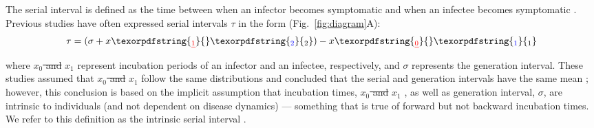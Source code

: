 \documentclass[12pt]{article}
\newcommand{\fref}[1]{Fig.~\ref{fig:#1}}
\newcommand{\gtime}{\sigma} %
\providecommand{\DIFaddtex}[1]{{\protect\color{blue}\uwave{#1}}} %
\providecommand{\DIFdeltex}[1]{{\protect\color{red}\sout{#1}}}                      %
\providecommand{\DIFaddbegin}{} %
\providecommand{\DIFaddend}{} %
\providecommand{\DIFdelbegin}{} %
\providecommand{\DIFdelend}{} %
\providecommand{\DIFadd}[1]{\texorpdfstring{\DIFaddtex{#1}}{#1}} %
\providecommand{\DIFdel}[1]{\texorpdfstring{\DIFdeltex{#1}}{}} %
\newcommand{\DIFscaledelfig}{0.5}
\newlength{\DIFdelgraphicswidth} %
\newlength{\DIFdelgraphicsheight} %
\newcommand{\DIFaddincludegraphics}[2][]{{\color{blue}\fbox{\DIFOincludegraphics[#1]{#2}}}} %
\newcommand{\DIFdelincludegraphics}[2][]{%
\sbox{\DIFdelgraphicsbox}{\DIFOincludegraphics[#1]{#2}}%
\settoboxwidth{\DIFdelgraphicswidth}{\DIFdelgraphicsbox} %
\settoboxtotalheight{\DIFdelgraphicsheight}{\DIFdelgraphicsbox} %
\scalebox{\DIFscaledelfig}{%
\parbox[b]{\DIFdelgraphicswidth}{\usebox{\DIFdelgraphicsbox}\\[-\baselineskip] \rule{\DIFdelgraphicswidth}{0em}}\llap{\resizebox{\DIFdelgraphicswidth}{\DIFdelgraphicsheight}{%
\setlength{\unitlength}{\DIFdelgraphicswidth}%
\begin{picture}(1,1)%
\thicklines\linethickness{2pt} %
{\color[rgb]{1,0,0}\put(0,0){\framebox(1,1){}}}%
{\color[rgb]{1,0,0}\put(0,0){\line( 1,1){1}}}%
{\color[rgb]{1,0,0}\put(0,1){\line(1,-1){1}}}%
\end{picture}%
}\hspace*{3pt}}} %
} %
\DeclareRobustCommand{\DIFaddbegin}{\DIFOaddbegin \let\includegraphics\DIFaddincludegraphics} %
\DeclareRobustCommand{\DIFaddend}{\DIFOaddend \let\includegraphics\DIFOincludegraphics} %
\DeclareRobustCommand{\DIFdelbegin}{\DIFOdelbegin \let\includegraphics\DIFdelincludegraphics} %
\DeclareRobustCommand{\DIFdelend}{\DIFOaddend \let\includegraphics\DIFOincludegraphics} %
\begin{document}
The serial interval is defined as the time between when an infector becomes symptomatic and when an infectee becomes symptomatic \citep{svensson2007note}.
Previous studies have often expressed serial intervals $\tau$ in the form (\fref{diagram}A):
\begin{equation}
\tau = (\gtime + x\DIFdelbegin \DIFdel{_1}\DIFdelend \DIFaddbegin \DIFadd{_2}\DIFaddend ) - x\DIFdelbegin \DIFdel{_0
}\DIFdelend \DIFaddbegin \DIFadd{_1
}\DIFaddend \end{equation}
where \DIFdelbegin \DIFdel{$x_0$ and }\DIFdelend $x_1$ \DIFaddbegin \DIFadd{and $x_2$ }\DIFaddend represent incubation periods of an infector and an infectee, respectively, and $\gtime$ represents the generation interval.
These studies assumed that \DIFdelbegin \DIFdel{$x_0$ and }\DIFdelend $x_1$ \DIFaddbegin \DIFadd{and $x_2$ }\DIFaddend follow the same distributions and concluded that the serial and generation intervals have the same mean \citep{svensson2007note,klinkenberg2011correlation,champredon2018equivalence, britton2019estimation};
however, this conclusion is based on the implicit assumption that incubation times, \DIFdelbegin \DIFdel{$x_0$ and }\DIFdelend $x_1$ \DIFaddbegin \DIFadd{and $x_2$}\DIFaddend , as well as generation interval, $\gtime$, are intrinsic to individuals (and not dependent on disease dynamics) --- something that is true of forward but not backward incubation times.
We refer to this definition as the intrinsic serial interval \DIFaddbegin \DIFadd{(\fref{diagram}A)}\DIFaddend .
\end{document}
